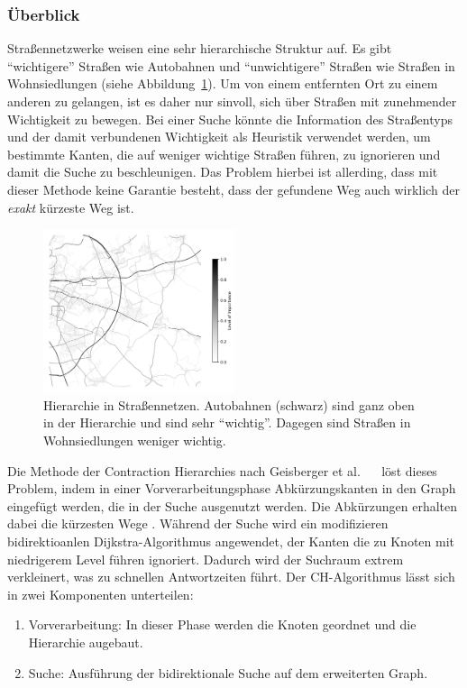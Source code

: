 \subsubsection{Überblick}
Straßennetzwerke weisen eine sehr hierarchische Struktur auf. Es gibt "`wichtigere"' Straßen wie \zB
Autobahnen und "`unwichtigere"' Straßen wie \zB Straßen in Wohnsiedlungen (siehe
Abbildung~\ref{fig:road_hierarchy}). Um von einem entfernten Ort zu einem anderen zu gelangen, ist
es daher nur sinvoll, sich über Straßen mit zunehmender Wichtigkeit zu bewegen. Bei einer Suche
könnte die Information des Straßentyps und der damit verbundenen Wichtigkeit als Heuristik verwendet
werden, um bestimmte Kanten, die auf weniger wichtige Straßen führen,  zu ignorieren und damit die
Suche zu beschleunigen. Das Problem hierbei ist allerding, dass mit dieser Methode keine Garantie
besteht, dass der gefundene Weg auch wirklich der \emph{exakt} kürzeste Weg ist.
\begin{figure}[h]
    \centering
    \includegraphics[width=0.5\textwidth]{figures/road_hierarchy.png}
    \caption[Hierarchie in Straßennetzen]{Hierarchie in Straßennetzen. Autobahnen (schwarz) sind
        ganz oben in der Hierarchie und sind sehr "`wichtig"'. Dagegen sind Straßen in
        Wohnsiedlungen weniger wichtig. \osmcr}
    \label{fig:road_hierarchy}
\end{figure}
Die Methode der Contraction Hierarchies nach Geisberger et al.
\cite{geisberger.workshop}~\cite{geisberger.thesis}~\cite{geisberger.exact} löst dieses Problem,
indem in einer Vorverarbeitungsphase Abkürzungskanten in den Graph eingefügt werden, die in der
Suche ausgenutzt werden. Die Abkürzungen erhalten dabei die kürzesten Wege \cite{Bast.20.04.2015}.
Während der Suche wird ein modifizieren bidirektioanlen Dijkstra-Algorithmus angewendet, der Kanten
die zu Knoten mit niedrigerem Level führen ignoriert. Dadurch wird der Suchraum extrem verkleinert,
was zu schnellen Antwortzeiten führt. Der CH-Algorithmus lässt sich in zwei Komponenten unterteilen:
\begin{enumerate}
    \item Vorverarbeitung: In dieser Phase werden die Knoten geordnet und die Hierarchie augebaut.
    \item Suche: Ausführung der bidirektionale Suche auf dem erweiterten Graph.
\end{enumerate}


